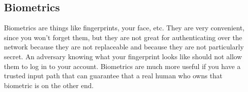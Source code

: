 \subsection{Biometrics}
Biometrics are things like fingerprints, your face, etc. They are very convenient, since you won't forget them, but they are not great for authenticating over the network because they are not replaceable and because they are not particularly secret. An adversary knowing what your fingerprint looks like should not allow them to log in to your account. Biometrics are much more useful if you have a trusted input path that can guarantee that a real human who owns that biometric is on the other end.
